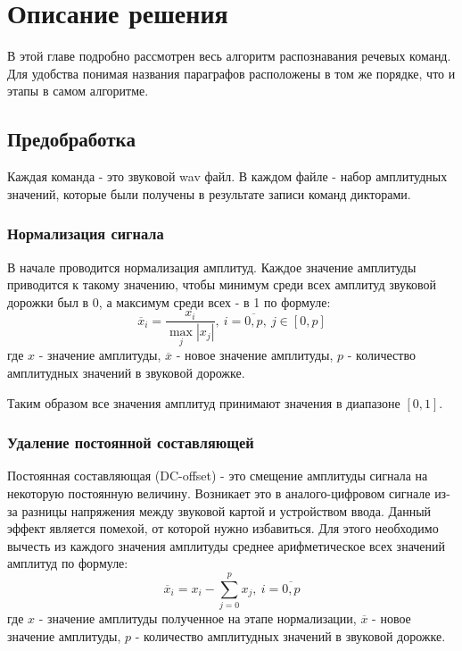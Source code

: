 \section{Описание решения}
В этой главе подробно рассмотрен весь алгоритм распознавания речевых команд. Для удобства понимая названия параграфов расположены в том же порядке, что и этапы в самом алгоритме.

\subsection{Предобработка}
Каждая команда - это звуковой wav файл. В каждом файле - набор амплитудных значений, которые были получены в результате записи команд дикторами. 

\subsubsection{Нормализация сигнала}
В начале проводится нормализация амплитуд. Каждое значение амплитуды приводится к такому значению, чтобы минимум среди всех амплитуд звуковой дорожки был в 0, а максимум среди всех - в 1 по формуле:
\begin{equation}
	\overline{x}_i=\dfrac{x_i}{\max_{j} |x_j|},~i=\overline{0, p},~j \in [0, p]
\end{equation}
где $x$ - значение амплитуды, $\overline{x}$ - новое значение амплитуды, $p$ - количество амплитудных значений в звуковой дорожке.

Таким образом все значения амплитуд принимают значения в диапазоне $[0,1]$.

\subsubsection{Удаление постоянной составляющей}
Постоянная составляющая (DC-offset) - это смещение амплитуды сигнала на некоторую постоянную величину. Возникает это в аналого-цифровом сигнале из-за разницы напряжения между звуковой картой и устройством ввода. Данный эффект является помехой, от которой нужно избавиться. Для этого необходимо вычесть из каждого значения амплитуды среднее арифметическое всех значений амплитуд по формуле:
\begin{equation}
\overline{x}_i=x_i - \sum_{j=0}^{p} x_j,~i=\overline{0, p}
\end{equation}
где $x$ - значение амплитуды полученное на этапе нормализации, $\overline{x}$ - новое значение амплитуды, $p$ - количество амплитудных значений в звуковой дорожке.

